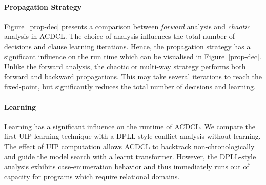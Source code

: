 \paragraph {\textbf{Propagation Strategy}}      
Figure~\ref{prop-dec} presents a comparison between {\em forward} analysis and
{\em chaotic} analysis in ACDCL.  The choice of analysis influences the 
total number of decisions and clause learning iterations.  Hence, the 
propagation strategy has a significant influence on the run time which 
can be visualised in Figure~\ref{prop-dec}.  Unlike the forward analysis, 
the chaotic or multi-way strategy performs both forward and backward 
propagations.  This may take several iterations to reach the fixed-point, but 
significantly reduces the total number of decisions and learning.  

\paragraph {\textbf{Learning}} Learning has a significant influence on
the runtime of ACDCL.  We compare the first-UIP learning technique with 
a DPLL-style conflict analysis without learning.  The effect of UIP computation 
allows ACDCL to backtrack non-chronologically and guide the model search with 
a learnt transformer.  However, the DPLL-style analysis exhibits
case-enumeration behavior and thus immediately runs out of capacity for programs 
which require relational domains.          


